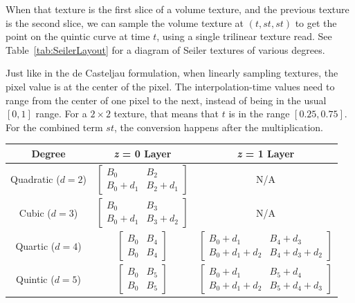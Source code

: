 \documentclass{jcgt}
\begin{document}
When that texture is the first slice of a volume texture, and the previous texture is the second slice, we can sample the volume texture at $(t, st, st)$ to get the point on the quintic curve at time $t$, using a single trilinear texture read.
See Table~\ref{tab:SeilerLayout} for a diagram of Seiler textures of various degrees.

Just like in the de Casteljau formulation, when linearly sampling textures, the pixel value is at the center of the pixel. The interpolation-time values need to range from the center of one pixel to the next, instead of being in the usual
$[0,1]$ range. For a $2 \times 2$ texture, that means that $t$ is in the range $[0.25, 0.75]$. For the combined term $st$, the conversion happens after the multiplication.

\begin{table}[t]
\centering\small
\renewcommand{\arraystretch}{1.5}

\begin{tabular}{|c|c|c|}
\hline
\textbf{Degree} & \textbf{\textit{z} = 0 Layer} & \textbf{\textit{z} = 1 Layer} \\
\hline

Quadratic ($d=2$) &
$\begin{bmatrix}
B_0 & B_2 \\
B_0 + d_1 & B_2 + d_1
\end{bmatrix}$
&
N/A\\
\hline

Cubic ($d=3$) &
$\begin{bmatrix}
B_0 & B_3 \\
B_0 + d_1 & B_3 + d_2
\end{bmatrix}$
&
N/A\\
\hline


Quartic ($d=4$) &
$\begin{bmatrix}
B_0 & B_4 \\
B_0 & B_4
\end{bmatrix}$
&
$\begin{bmatrix}
B_0 + d_1 & B_4 + d_3 \\
B_0 + d_1 + d_2 & B_4 + d_3 + d_2
\end{bmatrix}$

\\
\hline

Quintic ($d=5$) &
$\begin{bmatrix}
B_0 & B_5 \\
B_0 & B_5
\end{bmatrix}$
&
$\begin{bmatrix}
B_0 + d_1 & B_5 + d_4 \\
B_0 + d_1 + d_2 & B_5 + d_4 + d_3
\end{bmatrix}$
\\
\hline


\end{tabular}
\end{table}
\end{document}
